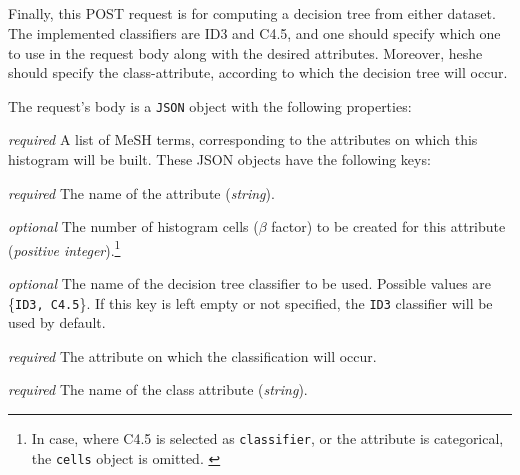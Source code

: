 \subsection[/smpc/decisionTree POST request]{\protect{}}\label{s:post3}
Finally, this POST request is for computing a decision tree from either dataset.
The implemented classifiers are ID3 and C4.5, and one should specify which one to use in the request body along with the desired attributes.
Moreover, he\myslash she should specify the class-attribute, according to which the decision tree will occur.
\begin{description}[labelwidth=5em, leftmargin=\dimexpr\labelwidth+\labelsep\relax]
     \item[Request:] The request's body is a \texttt{JSON} object with the following properties:

\begin{description}[labelwidth=9em, leftmargin=\dimexpr\labelwidth+\labelsep\relax]

    \item[\texttt{attributes}:] {\color{red}\textit{required}} A list of MeSH terms, corresponding to the attributes on which this histogram will be built.
    These JSON objects have the following keys:

    \begin{description}[labelwidth=3em, leftmargin=\dimexpr\labelwidth+\labelsep\relax]
        \item[\texttt{name}:] {\color{red}\textit{required}} The name of the attribute (\textit{string}).

        \item[\texttt{cells}:] {\color{blue}\textit{optional}} The number of histogram cells ($\beta$ factor) to be created for this attribute (\textit{positive integer}).\footnote{In case, where C4.5 is selected as \texttt{classifier}, or the attribute is categorical, the \texttt{cells} object is omitted. \label{refnote1}}
    \end{description}

    \item[\texttt{classifier}:] {\color{blue}\textit{optional}} The name of the decision tree classifier to be used.
    Possible values are \{\texttt{ID3, C4.5}\}.
    If this key is left empty or not specified, the \texttt{ID3} classifier will be used by default.

    \item[\texttt{class\_attribute}:] {\color{red}\textit{required}} The attribute on which the classification will occur.
    \begin{description}[labelwidth=3em, leftmargin=\dimexpr\labelwidth+\labelsep\relax]
        \item[\texttt{name}:] {\color{red}\textit{required}} The name of the class attribute (\textit{string}).


\end{description}
\end{description}
\end{description}
